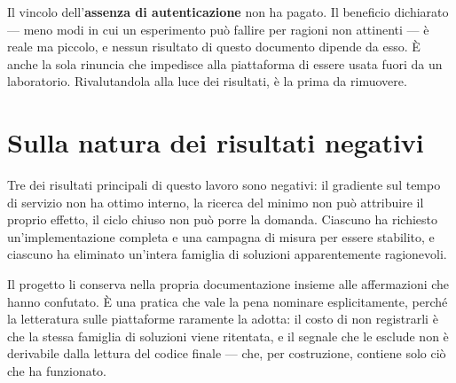Il vincolo dell'\textbf{assenza di autenticazione} non ha pagato. Il beneficio
dichiarato --- meno modi in cui un esperimento pu\`o fallire per ragioni non
attinenti --- \`e reale ma piccolo, e nessun risultato di questo documento
dipende da esso. \`E anche la sola rinuncia che impedisce alla piattaforma di
essere usata fuori da un laboratorio. Rivalutandola alla luce dei risultati,
\`e la prima da rimuovere.

\section{Sulla natura dei risultati negativi}

Tre dei risultati principali di questo lavoro sono negativi: il gradiente sul
tempo di servizio non ha ottimo interno, la ricerca del minimo non pu\`o
attribuire il proprio effetto, il ciclo chiuso non pu\`o porre la domanda.
Ciascuno ha richiesto un'implementazione completa e una campagna di misura per
essere stabilito, e ciascuno ha eliminato un'intera famiglia di soluzioni
apparentemente ragionevoli.

Il progetto li conserva nella propria documentazione insieme alle affermazioni
che hanno confutato. \`E una pratica che vale la pena nominare esplicitamente,
perch\'e la letteratura sulle piattaforme raramente la adotta: il costo di non
registrarli \`e che la stessa famiglia di soluzioni viene ritentata, e il segnale
che le esclude non \`e derivabile dalla lettura del codice finale --- che, per
costruzione, contiene solo ci\`o che ha funzionato.
